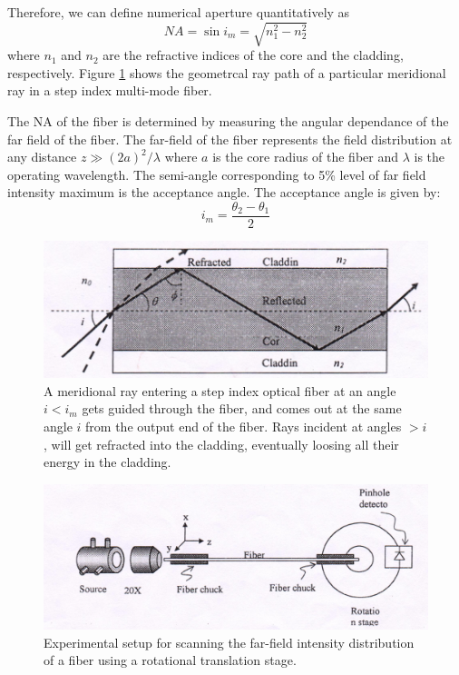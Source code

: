 \documentclass[%
 reprint,
nofootinbib,
 amsmath,amssymb,
 aps,
]{revtex4-2}
\begin{document}
Therefore, we can define numerical aperture quantitatively as
\begin{equation}\label{eq:NA}
	NA = \sin i_m = \sqrt{n_1^2 - n_2^2}
\end{equation}
where $ n_1 $ and $ n_2 $ are the refractive indices of the core and the cladding, respectively. Figure \ref{fig:na} shows the geometrcal ray path of a particular meridional ray in a step index multi-mode fiber.

The NA of the fiber is determined by measuring the angular dependance of the far field of the fiber. The far-field
of the fiber represents the field distribution at any distance
$ z \gg (2a)^2 / \lambda $ where $ a $ is the core radius of the fiber and $ \lambda $
is the operating wavelength. The semi-angle corresponding
to 5\% level of far field intensity maximum is the acceptance
angle. The acceptance angle is given by:
\begin{equation}\label{eq:sinNA}
	i_m = \dfrac{\theta_2 - \theta_1}{2}
\end{equation}
\begin{figure}
	\centering
	\includegraphics[scale=0.6]{na}
	\caption{A meridional ray entering a step index optical fiber at an angle $ i< i_m $ gets
		guided through the fiber, and comes out at the same angle $ i $ from the output end of the
		fiber. Rays incident at angles $ > i $, will get refracted into the cladding, eventually loosing
		all their energy in the cladding.}
	\label{fig:na}
\end{figure}

\begin{figure}
	\centering
	\includegraphics[scale = 0.5]{mm-NA}
	\caption{Experimental setup for scanning the far-field intensity distribution of a fiber using a rotational translation stage.}
	\label{fig:mm-na}
\end{figure}
\end{document}
